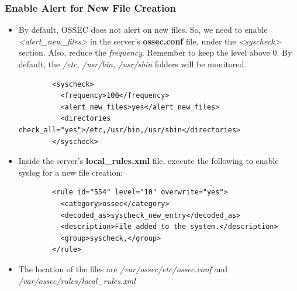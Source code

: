 \documentclass{article}
\begin{document}
\subsubsection{Enable Alert for New File Creation}
\begin{itemize}
    \item By default, OSSEC does not alert on new files. So, we need to enable \textit{<alert\_new\_files> } in the server's \textbf{ossec.conf } file, under the \textit{<syscheck> } section. Also, reduce the \textit{frequency}. Remember to keep the level above 0. By default, the \textit{/etc, /usr/bin, /usr/sbin } folders will be monitored.
    {
    \color{customGreen}%
    \begin{verbatim}
        <syscheck>
          <frequency>100</frequency>
          <alert_new_files>yes</alert_new_files>
          <directories check_all="yes">/etc,/usr/bin,/usr/sbin</directories>
        </syscheck>
    \end{verbatim}
    }
    \item Inside the server's \textbf{local\_rules.xml } file, execute the following to enable syslog for a new file creation:
    {
    \color{customGreen}%
    \begin{verbatim}
        <rule id="554" level="10" overwrite="yes">
          <category>ossec</category>
          <decoded_as>syscheck_new_entry</decoded_as>
          <description>File added to the system.</description>
          <group>syscheck,</group>
        </rule>
    \end{verbatim}
    }
    \item The location of the files are \textit{/var/ossec/etc/ossec.conf } and \textit{/var/ossec/rules/local\_rules.xml}
\end{itemize}
\end{document}
